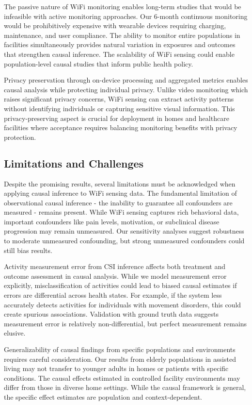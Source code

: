 \documentclass[journal]{IEEEtran}
\begin{document}
The passive nature of WiFi monitoring enables long-term studies that would be infeasible with active monitoring approaches. Our 6-month continuous monitoring would be prohibitively expensive with wearable devices requiring charging, maintenance, and user compliance. The ability to monitor entire populations in facilities simultaneously provides natural variation in exposures and outcomes that strengthen causal inference. The scalability of WiFi sensing could enable population-level causal studies that inform public health policy.

Privacy preservation through on-device processing and aggregated metrics enables causal analysis while protecting individual privacy. Unlike video monitoring which raises significant privacy concerns, WiFi sensing can extract activity patterns without identifying individuals or capturing sensitive visual information. This privacy-preserving aspect is crucial for deployment in homes and healthcare facilities where acceptance requires balancing monitoring benefits with privacy protection.

\subsection{Limitations and Challenges}

Despite the promising results, several limitations must be acknowledged when applying causal inference to WiFi sensing data. The fundamental limitation of observational causal inference - the inability to guarantee all confounders are measured - remains present. While WiFi sensing captures rich behavioral data, important confounders like pain levels, motivation, or subclinical disease progression may remain unmeasured. Our sensitivity analyses suggest robustness to moderate unmeasured confounding, but strong unmeasured confounders could still bias results.

Activity measurement error from CSI inference affects both treatment and outcome assessment in causal analysis. While we model measurement error explicitly, misclassification of activities could lead to biased causal estimates if errors are differential across health states. For example, if the system less accurately detects activities for individuals with movement disorders, this could create spurious associations. Validation with ground truth data suggests measurement error is relatively non-differential, but perfect measurement remains elusive.

Generalizability of causal findings from specific populations and environments requires careful consideration. Our results from elderly populations in assisted living may not transfer to younger adults in homes or patients with specific conditions. The causal effects estimated in controlled facility environments may differ from those in diverse home settings. While the causal framework is general, the specific effect estimates are population and context-dependent.
\end{document}
